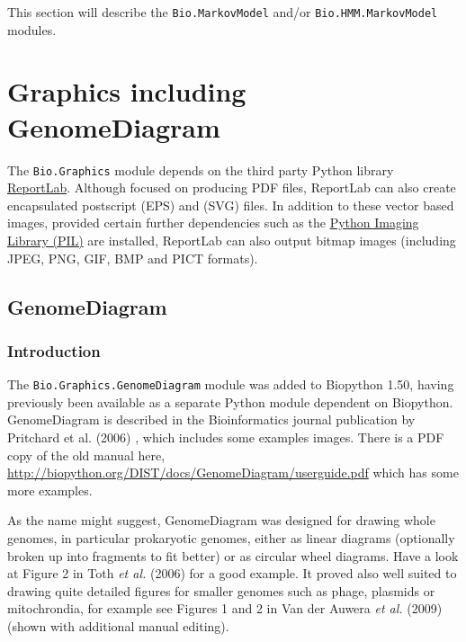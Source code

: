 \documentclass{report}
\begin{document}
This section will describe the \verb|Bio.MarkovModel| and/or \verb|Bio.HMM.MarkovModel| modules.

\chapter{Graphics including GenomeDiagram}
\label{chapter:graphics}

The \verb|Bio.Graphics| module depends on the third party Python library
\href{http://www.reportlab.org}{ReportLab}.  Although focused on producing PDF files,
ReportLab can also create encapsulated postscript (EPS) and (SVG) files.  In addition
to these vector based images, provided certain further dependencies such as the
\href{http://www.pythonware.com/products/pil/}{Python Imaging Library (PIL)} are
installed, ReportLab can also output bitmap images (including JPEG, PNG, GIF, BMP
and PICT formats).

\section{GenomeDiagram}
\label{sec:genomediagram}
\subsection{Introduction}

The \verb|Bio.Graphics.GenomeDiagram| module was added to Biopython 1.50,
having previously been available as a separate Python module dependent on Biopython.
GenomeDiagram is described in the Bioinformatics journal publication by Pritchard et al. (2006) \cite{pritchard2006},
which includes some examples images. There is a PDF copy of the old manual here,
\url{http://biopython.org/DIST/docs/GenomeDiagram/userguide.pdf} which has some
more examples.

As the name might suggest, GenomeDiagram was designed for drawing whole genomes, in
particular prokaryotic genomes, either as linear diagrams (optionally broken up into
fragments to fit better) or as circular wheel diagrams.  Have a look at Figure 2 in
Toth \textit{et al.} (2006) \cite{toth2006}
for a good example. It proved also well suited to drawing quite detailed figures for
smaller genomes such as phage, plasmids or mitochrondia, for example see Figures 1
and 2 in Van der Auwera \textit{et al.} (2009) \cite{vanderauwera2009}
(shown with additional manual editing).
\end{document}
